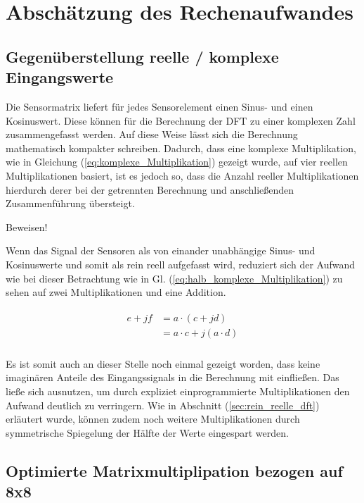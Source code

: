 \section{Abschätzung des Rechenaufwandes}\label{sec:abschaetzung_Rechenaufwand}

\subsection{Gegenüberstellung reelle / komplexe Eingangswerte}
Die Sensormatrix liefert für jedes Sensorelement einen Sinus- und einen Kosinuswert. Diese können für die Berechnung der DFT zu einer komplexen Zahl zusammengefasst werden. 
Auf diese Weise lässt sich die Berechnung mathematisch kompakter schreiben. Dadurch, dass eine komplexe Multiplikation, wie in Gleichung (\ref{eq:komplexe_Multiplikation}) 
gezeigt wurde, auf vier reellen Multiplikationen basiert,
ist es jedoch so, dass die Anzahl reeller Multiplikationen hierdurch derer bei der getrennten Berechnung und anschließenden Zusammenführung übersteigt.

Beweisen!



Wenn das Signal der Sensoren als von einander unabhängige Sinus- und Kosinuswerte  und somit als rein reell aufgefasst wird, reduziert sich der Aufwand wie 
bei dieser Betrachtung wie in Gl. (\ref{eq:halb_komplexe_Multiplikation}) zu sehen auf zwei Multiplikationen und eine Addition. 

\begin{align}\label{eq:halb_komplexe_Multiplikation}
\begin{split}
 e + jf &= a \cdot (c + jd)\\
        &= a \cdot c + j(a \cdot d)\\
\end{split}
\end{align}

Es ist somit auch an dieser Stelle noch einmal gezeigt worden, dass keine imaginären Anteile des Eingangssignals in die Berechnung mit einfließen.
Das ließe sich ausnutzen, um durch expliziet einprogrammierte Multiplikationen den Aufwand deutlich zu verringern. Wie in Abschnitt (\ref{sec:rein_reelle_dft})
erläutert wurde, können zudem noch weitere Multiplikationen durch symmetrische Spiegelung der Hälfte der Werte eingespart werden.

 
  


\subsection{Optimierte Matrixmultiplipation bezogen auf 8x8}\label{sec:OptimierteMatrixmultiplikation}


